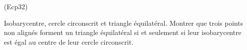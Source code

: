 \begin{tiny}(Ecp32)\end{tiny} Isobarycentre, cercle circonscrit et triangle équilatéral.\newline
Montrer que trois points non alignés forment un triangle équilatéral si et seulement si leur isobarycentre est égal au centre de leur cercle circonscrit.